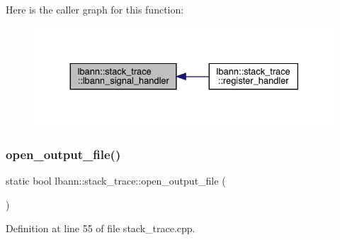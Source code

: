 Here is the caller graph for this function\+:\nopagebreak
\begin{figure}[H]
\begin{center}
\leavevmode
\includegraphics[width=330pt]{namespacelbann_1_1stack__trace_a4bf58556b9c42ac8930c273a921172de_icgraph}
\end{center}
\end{figure}
\mbox{\label{namespacelbann_1_1stack__trace_aa071d75a81128e2a8100d66529482842}} 
\subsubsection{\texorpdfstring{open\+\_\+output\+\_\+file()}{open\_output\_file()}}
{\footnotesize\ttfamily static bool lbann\+::stack\+\_\+trace\+::open\+\_\+output\+\_\+file (\begin{DoxyParamCaption}{ }\end{DoxyParamCaption})\hspace{0.3cm}{\ttfamily [static]}}



Definition at line 55 of file stack\+\_\+trace.\+cpp.


